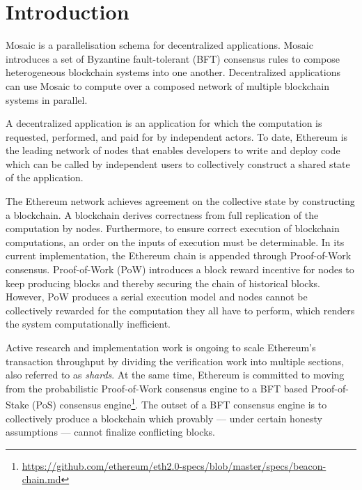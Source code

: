 \documentclass[12pt,a4paper]{article}
\begin{document}
\newpage
%
%
\section{Introduction}

Mosaic is a parallelisation schema for decentralized applications.
Mosaic introduces a set of Byzantine fault-tolerant (BFT) consensus rules to compose heterogeneous blockchain systems into one another.
Decentralized applications can use Mosaic to compute over a composed network of multiple blockchain systems in parallel.

A decentralized application is an application for which the computation is requested, performed, and paid for by independent actors.
To date, Ethereum is the leading network
of nodes that enables developers to write and deploy code which can be called by independent users to collectively construct a shared state of the application.

The Ethereum network achieves agreement on the collective state by constructing a blockchain.
A blockchain derives correctness from full replication of the computation by nodes.
Furthermore, to ensure correct execution of blockchain computations, an order on the inputs of execution must be determinable.
In its current implementation, the Ethereum chain is appended through Proof-of-Work consensus.
Proof-of-Work (PoW) introduces a block reward incentive for nodes to keep producing blocks and thereby securing the chain of historical blocks.
However, PoW produces a serial execution model and nodes cannot be collectively rewarded for the computation they all have to perform, which renders the system computationally inefficient\cite{verifiersdilemma}.

Active research and implementation work is ongoing to scale Ethereum's transaction throughput by dividing the verification work into multiple sections, also referred to as \emph{shards}.
At the same time, Ethereum is committed to moving from the probabilistic Proof-of-Work consensus engine to a BFT based Proof-of-Stake (PoS) consensus engine\footnote{
	\url{https://github.com/ethereum/eth2.0-specs/blob/master/specs/beacon-chain.md}
}.
The outset of a BFT consensus engine is to collectively produce a blockchain which provably --- under certain honesty assumptions --- cannot finalize conflicting blocks.
\end{document}
